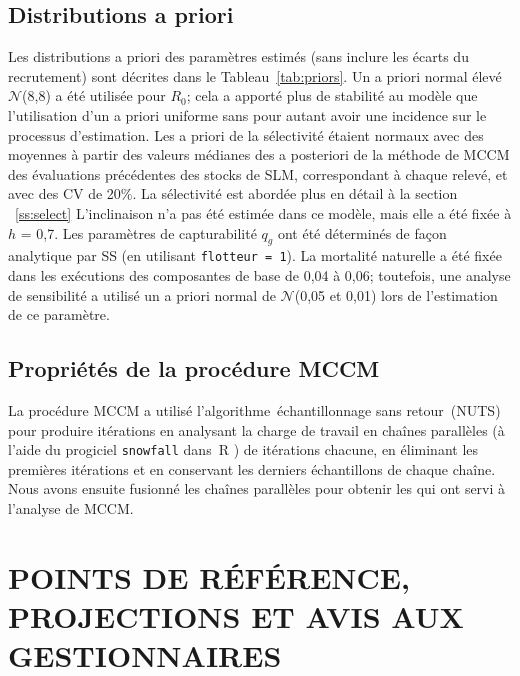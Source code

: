 \documentclass[11pt]{book}
\newcommand{\Norm}{\mathcal{N}}%
\newcommand{\angL}{\guillemotleft\,}
\newcommand{\angR}{\,\guillemotright}
\newcommand{\pc}{\%}
\newcommand{\code}[1]{\normalsize\texttt{#1}\normalsize}%
\begin{document}
\subsection{Distributions a priori}

Les distributions a priori des param\`{e}tres estim\'{e}s (sans inclure les \'{e}carts du recrutement) sont d\'{e}crites dans le Tableau~\ref{tab:priors}.
Un a priori normal \'{e}lev\'{e} $\Norm$(8,8) a \'{e}t\'{e} utilis\'{e}e pour $R_0$; cela a apport\'{e} plus de stabilit\'{e} au mod\`{e}le que l'utilisation d'un a priori uniforme sans pour autant avoir une incidence sur le processus d'estimation.
Les a priori de la s\'{e}lectivit\'{e} \'{e}taient normaux avec des moyennes \`{a} partir des valeurs m\'{e}dianes des a posteriori de la m\'{e}thode de MCCM des \'{e}valuations pr\'{e}c\'{e}dentes des stocks de SLM, correspondant \`{a} chaque relev\'{e}, et avec des CV de 20\pc{}.
La s\'{e}lectivit\'{e} est abord\'{e}e plus en d\'{e}tail \`{a} la section ~\ref{ss:select}
L'inclinaison n'a pas \'{e}t\'{e} estim\'{e}e dans ce mod\`{e}le, mais elle a \'{e}t\'{e} fix\'{e}e \`{a} $h$ = 0,7.
Les param\`{e}tres de capturabilit\'{e} $q_g$ ont \'{e}t\'{e} d\'{e}termin\'{e}s de fa\c{c}on analytique par SS (en utilisant \code{flotteur = 1}).
La mortalit\'{e} naturelle a \'{e}t\'{e} fix\'{e}e dans les ex\'{e}cutions des composantes de base de 0,04 \`{a} 0,06; toutefois, une analyse de sensibilit\'{e} a utilis\'{e} un a priori normal de $\Norm$(0,05 et 0,01) lors de l'estimation de ce param\`{e}tre.

\subsection{Propri\'{e}t\'{e}s de la proc\'{e}dure MCCM}

La proc\'{e}dure MCCM a utilis\'{e} l'algorithme \angL \'{e}chantillonnage sans retour\angR{} (NUTS) \citep{Monnahan-Kristensen:2018, Monnahan-etal:2019} pour produire \nSims{} it\'{e}rations en analysant la charge de travail en \nChains{} cha\^{i}nes parall\`{e}les (\`{a} l'aide du progiciel \code{snowfall} dans~R \citealt{R:2015_snowfall}) de \cSims{} it\'{e}rations chacune, en \'{e}liminant les \cBurn{} premi\`{e}res it\'{e}rations et en conservant les \cSamps{} derniers \'{e}chantillons de chaque cha\^{i}ne.
Nous avons ensuite fusionn\'{e} les cha\^{i}nes parall\`{e}les pour obtenir les \Nmcmc{} qui ont servi \`{a} l'analyse de MCCM.

\section{POINTS DE R\'{E}F\'{E}RENCE, PROJECTIONS ET AVIS AUX GESTIONNAIRES}
\end{document}
